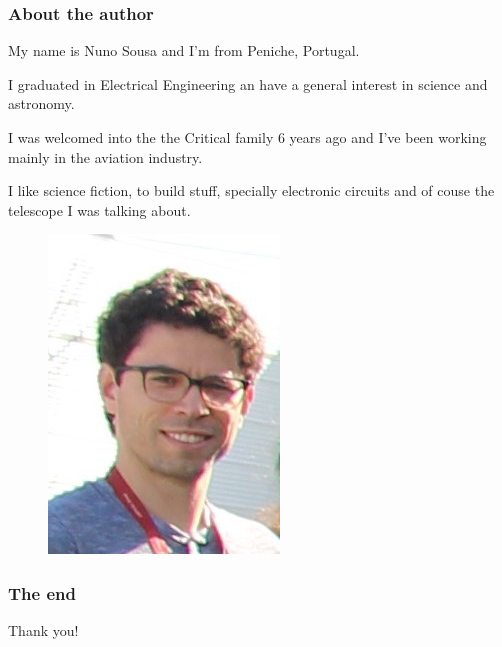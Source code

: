 \documentclass{beamer}
\begin{document}
\begin{frame}
\frametitle{About the author}
My name is Nuno Sousa and I'm from Peniche, Portugal.

I graduated in Electrical Engineering an have a general interest in science and astronomy.

I was welcomed into the the Critical family 6 years ago and I've been working mainly in the aviation industry.

I like science fiction, to build stuff, specially electronic circuits and of couse the telescope I was talking about.

\begin{figure}
\includegraphics[scale=0.3]{assets/self.jpg}
\end{figure}
\end{frame}

\begin{frame}
\frametitle{The end}
\centering
Thank you!
\end{frame}
\end{document}
